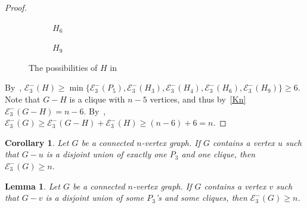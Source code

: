 \documentclass[a4paper,12pt]{article}
\theoremstyle{plain}
\newtheorem{lemma}[thm]{Lemma}
\newtheorem{corollary}[thm]{Corollary}
\begin{document}
\begin{proof}
\begin{figure}[htbp]
\begin{subfigure}[t]{.18\textwidth}
\caption{$H_6$}
\label{fig:4} 
\end{subfigure}
\begin{subfigure}[t]{.18\textwidth}
\centering
{}
\caption{$H_9$}
\label{fig:5}
\end{subfigure}
\caption{The possibilities of $H$ in }
\label{fig:oneQ_1+oneC_1}
\end{figure}  

By~, $\mathcal{E}_3^-(H)\geq \min\{\mathcal{E}_3^-(P_5),\mathcal{E}_3^-(H_3),\mathcal{E}_3^-(H_4),\mathcal{E}_3^-(H_6),\mathcal{E}_3^-(H_9)\}\geq 6$. Note that $G-H$ is a clique with $n-5$ vertices, and thus by~\ref{Kn} $\mathcal{E}_3^-(G-H)=n-6$. By~, $\mathcal{E}_3^-(G)\geq \mathcal{E}_3^-(G-H)+\mathcal{E}_3^-(H)\geq (n-6)+6=n$.
\end{proof}

\begin{corollary}\label{cor:oneP3+onecliques}
Let $G$ be a connected $n$-vertex graph. If $G$ contains a vertex $u$ such that $G-u$ is a disjoint union of exactly one $P_3$ and one clique, then $\mathcal{E}_3^{-}(G) \geq n$.
\end{corollary}


\begin{lemma}\label{lem:P3+cliques}
Let $G$ be a connected $n$-vertex graph. If $G$ contains a vertex $v$ such that $G-v$ is a disjoint union of some $P_3$'s and some cliques, then $\mathcal{E}_3^{-}(G) \geq n$.
\end{lemma}
\end{document}
